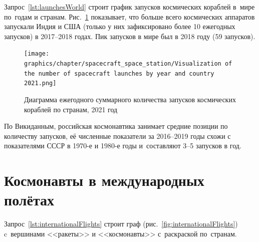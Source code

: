 Запрос~\ref{lst:launchesWorld} строит график 
запусков космических кораблей в~мире по~годам и странам. 
Рис.~\ref{fig:launchesWorld} показывает, что больше всего космических аппаратов 
запускали Индия и США 
(только у них зафиксировано более 10 ежегодных запусков) в 2017--2018 годах. 
Пик запусков в мире был в 2018 году (59 запусков). 




\newpage

\begin{figure}[h!]
  \texttt{[image: graphics/chapter/spacecraft\_space\_station/Visualization of the number of spacecraft launches by year and country 2021.png]}
  \caption[График запусков космических кораблей в мире по годам и странам, 2021 год.]
    {Диаграмма ежегодного суммарного количества запусков космических\newline
     кораблей по странам, 2021 год}
  \label{fig:launchesWorld}%
\end{figure}


\newpage

По Викиданным, российская космонавтика занимает средние позиции по количеству запусков, 
её численные показатели за 2016--2019 годы схожи с показателями СССР в 1970-е и 1980-е годы 
и~составляют 3--5 запусков в год.





\section{Космонавты в международных полётах}

Запрос~\ref{lst:internationalFlights} строит граф (рис.~\ref{fig:internationalFlights}) 
c~вершинами <<ракеты>> и <<космонавты>> с~раскраской по~странам.

